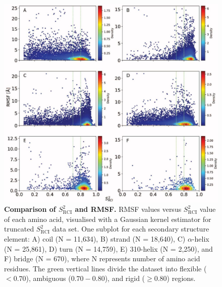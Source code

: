 \begin{figure}[H]
    \centering
    \includegraphics[width=\linewidth]{pLDDT//plddt_figures//supplementary_bhawna/supfig17.pdf}
    \caption{\textbf{Comparison of $S_{\text{RCI}}^{2}$ and RMSF.} RMSF values versus $S_{\text{RCI}}^{2}$ value of each amino acid, visualised with a Gaussian kernel estimator for truncated $S_{\text{RCI}}^{2}$ data set. One subplot for each secondary structure element: A) coil (N = 11,634), B) strand (N = 18,640), C) $\alpha$-helix (N = 25,861), D) turn (N = 14,759), E) 310-helix (N = 2,250), and F) bridge (N = 670), where N represents number of amino acid residues. The green vertical lines divide the dataset into flexible ($<0.70$), ambiguous ($0.70 - 0.80$), and rigid ($\geq 0.80$) regions.}

    \label{fig:plddt_sup:sup17}
\end{figure}



